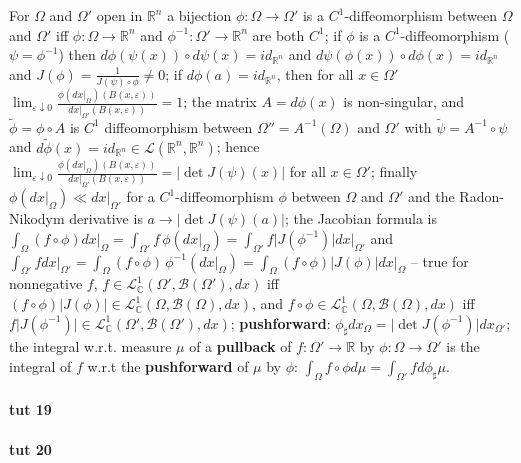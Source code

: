\documentclass[a4paper]{article}
\newcommand{\Lcal}{\mathcal{L}}
\newcommand{\Bcal}{\mathcal{B}}
\newcommand{\real}{\mathbb{R}}
\newcommand{\cplx}{\mathbb{C}}
\begin{document}
For $\Omega$ and $\Omega'$ open in $\real^n$ a bijection $\phi\colon \Omega \to \Omega'$
is a $C^1$-diffeomorphism between $\Omega$ and $\Omega'$ iff $\phi\colon \Omega \to \real^n$
and $\phi^{-1}\colon \Omega' \to \real^n$ are both $C^1$;
%
if $\phi$ is a $C^1$-diffeomorphism ($\psi = \phi^{-1}$) then
$d\phi(\psi(x)) \circ d\psi(x) = id_{\real^n}$ and
$d\psi(\phi(x)) \circ d\phi(x) = id_{\real^n}$ and
$J(\phi) = \tfrac1{J(\psi) \circ \phi} \neq 0$;
%
if $d\phi(a) = id_{\real^n}$, then for all $x\in \Omega'$
$\lim_{\varepsilon\downarrow 0}
  \tfrac{\phi(dx\big\vert_{\Omega})(B(x, \varepsilon))}
        {dx\big\vert_{\Omega'}(B(x, \varepsilon))} = 1$;
%
the matrix $A = d\phi(x)$ is non-singular, and $\tilde{\phi} = \phi \circ A$ is $C^1$
diffeomorphism between $\Omega'' = A^{-1}(\Omega)$ and $\Omega'$ with
$\tilde{\psi} = A^{-1} \circ \psi$ and
$d\tilde{\phi}(x) = id_{\real^n} \in \Lcal(\real^n, \real^n)$;
%
hence
$\lim_{\varepsilon\downarrow 0}
  \tfrac{\phi(dx\big\vert_{\Omega})(B(x, \varepsilon))}
        {dx\big\vert_{\Omega'}(B(x, \varepsilon))}
  = \lvert \det J(\psi)(x) \rvert$ for all $x\in \Omega'$;
%
finally $\phi(dx\big\vert_{\Omega}) \ll dx\big\vert_{\Omega'}$ for a $C^1$-diffeomorphism
$\phi$ between $\Omega$ and $\Omega'$ and the Radon-Nikodym derivative is
$a \to \lvert \det J(\psi)(a) \rvert$;
%
the Jacobian formula is
$\int_\Omega (f\circ \phi) dx\big\vert_{\Omega}
  = \int_{\Omega'} f \, \phi(dx\big\vert_{\Omega})
  = \int_{\Omega'} f \lvert J(\phi^{-1})\rvert dx\big\vert_{\Omega'}$
and
$\int_{\Omega'} f dx\big\vert_{\Omega'}
  = \int_{\Omega} (f\circ \phi) \, \phi^{-1}(dx\big\vert_{\Omega})
  = \int_{\Omega} (f\circ \phi) \lvert J(\phi)\rvert dx\big\vert_{\Omega}$
-- true for nonnegative $f$, $f\in \Lcal_\cplx^1(\Omega', \Bcal(\Omega'), dx)$
iff $(f \circ \phi) \lvert J(\phi) \rvert \in \Lcal_\cplx^1(\Omega, \Bcal(\Omega), dx)$,
and $f \circ \phi \in \Lcal_\cplx^1(\Omega, \Bcal(\Omega), dx)$
iff $f \lvert J(\phi^{-1}) \rvert \in \Lcal_\cplx^1(\Omega', \Bcal(\Omega'), dx)$;
%
{\bf pushforward}: $\phi_\sharp dx_\Omega = \lvert \det J(\phi^{-1}) \rvert dx_{\Omega'}$;
%
the integral w.r.t. measure $\mu$ of a {\bf pullback} of $f\colon \Omega'\to \real$ by
$\phi\colon \Omega\to\Omega'$ is the integral of $f$ w.r.t the {\bf pushforward}
of $\mu$ by $\phi$: $\int_\Omega f\circ \phi d\mu = \int_{\Omega'} f d\phi_\sharp\mu$.


\paragraph{tut 19} %
\label{par:tut_19}





\paragraph{tut 20} %
\label{par:tut_20}



\end{document}
